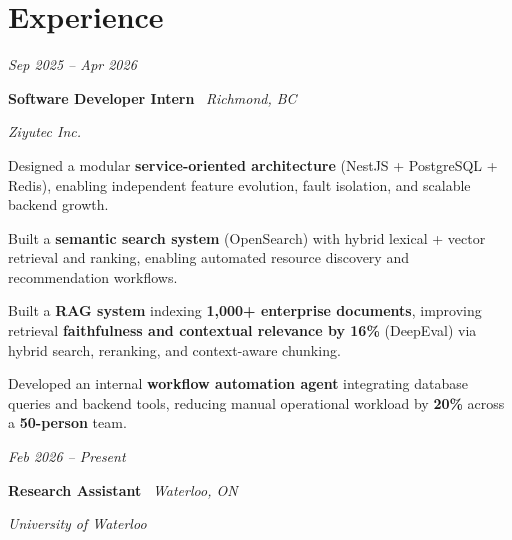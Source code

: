 \section{Experience}

    \begin{twocolentry}{

    \textit{Sep 2025 -- Apr 2026}}
        \textbf{Software Developer Intern} \textbar\ \textit{Richmond, BC}
        
        \textit{Ziyutec Inc.}
    \end{twocolentry}

    \vspace{0.10 cm}
    \begin{onecolentry}
        \begin{highlights}
    
    \item Designed a modular \textbf{service-oriented architecture} (NestJS + PostgreSQL + Redis), enabling independent feature evolution, fault isolation, and scalable backend growth.

    \item Built a \textbf{semantic search system} (OpenSearch) with hybrid lexical + vector retrieval and ranking, enabling automated resource discovery and recommendation workflows.

    \item Built a \textbf{RAG system} indexing \textbf{1,000+ enterprise documents}, improving retrieval \textbf{faithfulness and contextual relevance by 16\%} (DeepEval) via hybrid search, reranking, and context-aware chunking.

    \item Developed an internal \textbf{workflow automation agent} integrating database queries and backend tools, reducing manual operational workload by \textbf{20\%} across a \textbf{50-person} team.

        
        \end{highlights}
    \end{onecolentry}
\vspace{0.2cm}    \begin{twocolentry}{

    \textit{Feb 2026 -- Present}}
        \textbf{Research Assistant} \textbar\ \textit{Waterloo, ON}
        
        \textit{University of Waterloo}
    \end{twocolentry}

